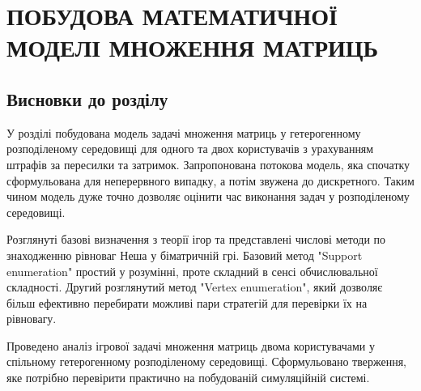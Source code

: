 
\chapter{ПОБУДОВА МАТЕМАТИЧНОЇ МОДЕЛІ МНОЖЕННЯ МАТРИЦЬ}





\section*{Висновки до розділу}

У розділі побудована модель задачі множення матриць у гетерогенному розподіленому середовищі для одного та двох користувачів з урахуванням штрафів за пересилки та затримок. Запропонована потокова модель, яка спочатку сформульована для неперервного випадку, а потім звужена до дискретного. Таким чином модель дуже точно дозволяє оцінити час виконання задач у розподіленому середовищі.

Розглянуті базові визначення з теорії ігор та представлені числові методи по знаходженню рівноваг Неша у біматричній грі. Базовий метод "Support enumeration" простий у розумінні, проте складний в сенсі обчислювальної складності. Другий розглянутий метод "Vertex enumeration", який дозволяє більш ефективно перебирати можливі пари стратегій для перевірки їх на рівновагу.

Проведено аналіз ігрової задачі множення матриць двома користувачами у спільному гетерогенному розподіленому середовищі. Сформульовано тверження, яке потрібно перевірити практично на побудованій симуляційній системі.

